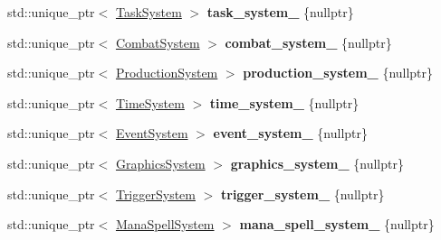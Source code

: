 \begin{DoxyCompactItemize}
\item 
std\+::unique\+\_\+ptr$<$ \hyperlink{class_task_system}{Task\+System} $>$ {\bfseries task\+\_\+system\+\_\+} \{nullptr\}\hypertarget{class_game_ace7adb25b62f8b56cd0c004c9d2e4ad8}{}\label{class_game_ace7adb25b62f8b56cd0c004c9d2e4ad8}

\item 
std\+::unique\+\_\+ptr$<$ \hyperlink{class_combat_system}{Combat\+System} $>$ {\bfseries combat\+\_\+system\+\_\+} \{nullptr\}\hypertarget{class_game_ac749b13cf8ad3a0629b5af28d4e81b75}{}\label{class_game_ac749b13cf8ad3a0629b5af28d4e81b75}

\item 
std\+::unique\+\_\+ptr$<$ \hyperlink{class_production_system}{Production\+System} $>$ {\bfseries production\+\_\+system\+\_\+} \{nullptr\}\hypertarget{class_game_a1eee6c4d037835a6fec98e4cbc1b91b0}{}\label{class_game_a1eee6c4d037835a6fec98e4cbc1b91b0}

\item 
std\+::unique\+\_\+ptr$<$ \hyperlink{class_time_system}{Time\+System} $>$ {\bfseries time\+\_\+system\+\_\+} \{nullptr\}\hypertarget{class_game_add56890bc1393af525a2658ff0476221}{}\label{class_game_add56890bc1393af525a2658ff0476221}

\item 
std\+::unique\+\_\+ptr$<$ \hyperlink{class_event_system}{Event\+System} $>$ {\bfseries event\+\_\+system\+\_\+} \{nullptr\}\hypertarget{class_game_a2e8dd50347570cc742aef91e6f065312}{}\label{class_game_a2e8dd50347570cc742aef91e6f065312}

\item 
std\+::unique\+\_\+ptr$<$ \hyperlink{class_graphics_system}{Graphics\+System} $>$ {\bfseries graphics\+\_\+system\+\_\+} \{nullptr\}\hypertarget{class_game_aa1bee90e713de5f7b151fee08bdb9926}{}\label{class_game_aa1bee90e713de5f7b151fee08bdb9926}

\item 
std\+::unique\+\_\+ptr$<$ \hyperlink{class_trigger_system}{Trigger\+System} $>$ {\bfseries trigger\+\_\+system\+\_\+} \{nullptr\}\hypertarget{class_game_a7909364b4dac4fda1ae101dc63d5cef8}{}\label{class_game_a7909364b4dac4fda1ae101dc63d5cef8}

\item 
std\+::unique\+\_\+ptr$<$ \hyperlink{class_mana_spell_system}{Mana\+Spell\+System} $>$ {\bfseries mana\+\_\+spell\+\_\+system\+\_\+} \{nullptr\}\hypertarget{class_game_a8e5ab6f6e518ae3a137594d109906c11}{}\label{class_game_a8e5ab6f6e518ae3a137594d109906c11}


\end{DoxyCompactItemize}
